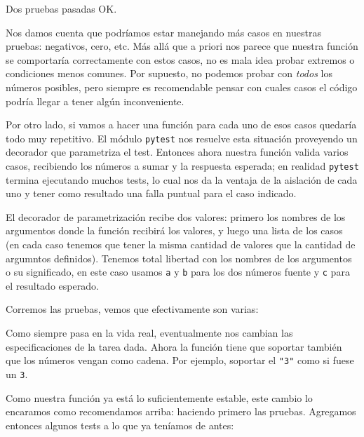 Dos pruebas pasadas OK.

Nos damos cuenta que podríamos estar manejando más casos en nuestras pruebas: negativos, cero, etc. Más allá que a priori nos parece que nuestra función se comportaría correctamente con estos casos, no es mala idea probar extremos o condiciones menos comunes. Por supuesto, no podemos probar con \textit{todos} los números posibles, pero siempre es recomendable pensar con cuales casos el código podría llegar a tener algún inconveniente.

Por otro lado, si vamos a hacer una función para cada uno de esos casos quedaría todo muy repetitivo. El módulo \texttt{pytest} nos resuelve esta situación proveyendo un decorador que parametriza el test. Entonces ahora nuestra función valida varios casos, recibiendo los números a sumar y la respuesta esperada; en realidad \texttt{pytest} termina ejecutando muchos tests, lo cual nos da la ventaja de la aislación de cada uno y tener como resultado una falla puntual para el caso indicado.


El decorador de parametrización recibe dos valores: primero los nombres de los argumentos donde la función recibirá los valores, y luego una lista de los casos (en cada caso tenemos que tener la misma cantidad de valores que la cantidad de argumntos definidos). Tenemos total libertad con los nombres de los argumentos o su significado, en este caso usamos \texttt{a} y \texttt{b} para los dos números fuente y \texttt{c} para el resultado esperado.

Corremos las pruebas, vemos que efectivamente son varias:


Como siempre pasa en la vida real, eventualmente nos cambian las especificaciones de la tarea dada. Ahora la función tiene que soportar también que los números vengan como cadena. Por ejemplo, soportar el \texttt{"3"} como si fuese un \texttt{3}. 

Como nuestra función ya está lo suficientemente estable, este cambio lo encaramos como recomendamos arriba: haciendo primero las pruebas. Agregamos entonces algunos tests a lo que ya teníamos de antes:


